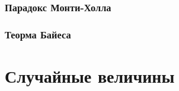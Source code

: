 \documentclass[
  letterpaper,
  DIV=11,
  numbers=noendperiod]{scrreprt}
\newcommand{\const}{\text{const}}
\newcommand{\lp}{\left(}
\newcommand{\rp}{\right)}
\newcommand{\lb}{\left[}
\newcommand{\rb}{\right]}
\newcommand*\circled[1]{\tikz[baseline=(char.base)]{
            \node[shape=circle,draw,inner sep=2pt] (char) {#1};}}
\newcommand{\xor}{\,\text{XOR}\,}
\newcommand{\setN}{\mathbb{N}}
\newcommand{\setNo}{\mathbb{N}_{0}}
\newcommand{\setZ}{\mathbb{Z}}
\newcommand{\setQ}{\mathbb{Q}}
\newcommand{\setR}{\mathbb{R}}
\newcommand{\setC}{\mathbb{C}}
\newcommand{\vm}[1]{\mathbf{#1}} %
\newcommand{\prob}{\mathbb{P}}
\newcommand{\expect}{\mathbb{E}}
\newcommand{\disp}{\mathbb{D}}
\newcommand{\var}{\mathrm{var}}
\newcommand{\cov}{\mathrm{cov}}
\newcommand{\cor}{\mathrm{cor}}
\newcommand{\se}{\mathrm{se}}
\newcommand{\sd}{\mathrm{sd}}
\newcommand{\iid}{\text{i.i.d}}
\newcommand{\Cline}[2][red]{{\sbox\MBox{$#2$}%
  \rlap{\usebox\MBox}\color{#1}\rule[-1.2\dp\MBox]{\wd\MBox}{0.5pt}}}
\newcommand{\norm}{\mathcal{N}}
\newcommand{\def}{\overset{\text{def}}{=}}
\newcommand{\sgn}{\mathrm{sgn}}
\newcommand{\artanh}{\text{artanh}}
\newcommand{\median}{\mathrm{median}}
\newcommand{\mean}{\mathbb{M}}
\newcommand{\skew}{\mathrm{skew}}
\newcommand{\kurt}{\mathrm{kurt}}
\theoremstyle{definition}
\theoremstyle{remark}
\begin{document}
\subsection{Парадокс Монти-Холла}\label{stats-rand-exp-prob-monty}

\subsection{Теорма Байеса}\label{stats-rand-exp-bayes}


\chapter{Случайные величины}\label{stats-rand-values}

\usepackage{xcolor}
\usepackage{soul}
\usepackage{amsmath, amsfonts}

\newcommand{\const}{\text{const}}
\newcommand{\lp}{\left(}
\newcommand{\rp}{\right)}
\newcommand{\lb}{\left[}
\newcommand{\rb}{\right]}

\newcommand*\circled[1]{\tikz[baseline=(char.base)]{
            \node[shape=circle,draw,inner sep=2pt] (char) {#1};}}

\newcommand{\xor}{\,\text{XOR}\,}

\newcommand{\setN}{\mathbb{N}}
\newcommand{\setNo}{\mathbb{N}_{0}}
\newcommand{\setZ}{\mathbb{Z}}
\newcommand{\setQ}{\mathbb{Q}}
\newcommand{\setR}{\mathbb{R}}
\newcommand{\setC}{\mathbb{C}}

\newcommand{\vm}[1]{\mathbf{#1}}

\newcommand{\Falg}{\mathcal{F}}
\newcommand{\prob}{\mathbb{P}}
\newcommand{\expect}{\mathbb{E}}
\newcommand{\disp}{\mathbb{D}}
\newcommand{\var}{\text{var}}
\newcommand{\cov}{\text{cov}}
\newcommand{\cor}{\text{cor}}
\newcommand{\se}{\text{se}}
\newcommand{\sd}{\text{sd}}
\newcommand{\iid}{\text{i.i.d}}

\newsavebox{\MBox}
\newcommand{\Cline}[2][red]{{\sbox\MBox{$#2$}%
  \rlap{\usebox\MBox}\color{#1}\rule[-1.2\dp\MBox]{\wd\MBox}{0.5pt}}}

\newcommand{\norm}{\mathcal{N}}

\newcommand{\def}{\overset{\text{def}}{=}}
\newcommand{\sgn}{\text{sgn}}

\usepackage{amsmath}
\DeclareMathOperator\artanh{artanh}

\newcommand{\median}{\text{median}}
\newcommand{\mean}{\mathbb{M}}
\newcommand{\skew}{\mathrm{skew}}
\newcommand{\kurt}{\mathrm{kurt}}
\end{document}
